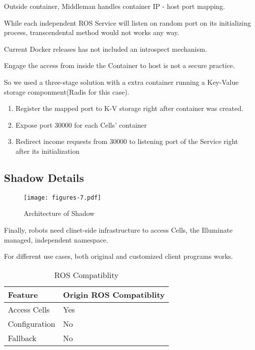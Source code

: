 Outside container, Middleman handles container IP - host port mapping.

While each independent ROS Service will listen on random port on its
initializing process, transcendental method would not works any way. 

Current Docker releases has not included an introspect mechanism.

Engage the access from inside the Container to host is not a secure practice.

So we used a three-stage solution with a extra container running a Key-Value storage componment(Radis for this case).
\begin{enumerate}
    \item Register the mapped port to K-V storage right after container was created.
    \item Expose port 30000 for each Cells' container
    \item Redirect income requests from 30000 to listening port of the Service right after its initialization
\end{enumerate}

\subsection{Shadow Details}

\begin{figure}[!t]
\centering
\texttt{[image: figures-7.pdf]}
\caption{Architecture of Shadow}
\label{figure:aosh}
\end{figure}

Finally, robots need clinet-side infrastructure to access Cells,
the Illuminate managed, independent namespace.

For different use cases, both original and customized client programs works.

\begin{table}
  \caption{ROS Compatiblity}
  \label{table:shadow-compatible}
  \centering
  \begin{tabular}{ll}
    \hline
    \bfseries Feature & \bfseries Origin ROS Compatiblity \\
    \hline
    Access Cells  & Yes  \\
    Configuration & No   \\
    Fallback      & No   \\
    \hline
  \end{tabular}
\end{table} 

